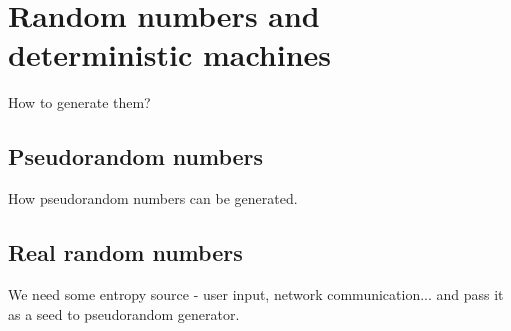 
\chapter{Random numbers and deterministic machines}
How to generate them?
\section{Pseudorandom numbers}
How pseudorandom numbers can be generated.

\section{Real random numbers}
We need some entropy source - user input, network communication... and pass it as a seed to pseudorandom generator.
